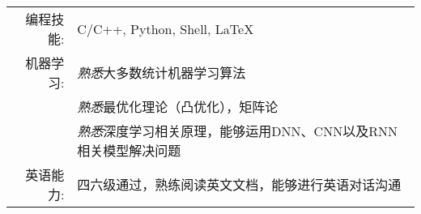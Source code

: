 %
%


 
\renewcommand{\arraystretch}{1.1}

	\begin{tabular}{>{}r>{}p{13cm}} 
		\textsc{编程技能:}      &C/C++, Python, Shell, LaTeX　\\  
		\textsc{机器学习:} 		&\emph{熟悉}大多数统计机器学习算法 \\
							　　　&\emph{熟悉}最优化理论（凸优化），矩阵论 \\
							　　　&\emph{熟悉}深度学习相关原理，能够运用DNN、CNN以及RNN相关模型解决问题 \\
		\textsc{英语能力:}      &四六级通过，熟练阅读英文文档，能够进行英语对话沟通 \\
	\end{tabular}
	
